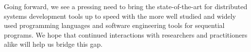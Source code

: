 Going forward, we see a pressing need to bring the state-of-the-art for
distributed systems development tools up to speed with the more well studied and widely
used programming
languages and software engineering tools for sequential
programs. We hope that continued interactions with researchers and
practitioners alike will help us bridge this gap.



